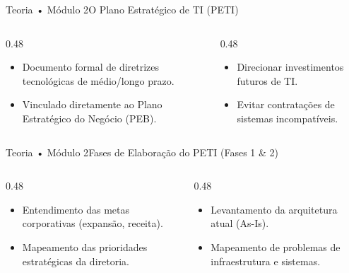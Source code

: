 \begin{senaiframe}{Teoria • Módulo 2}{O Plano Estratégico de TI (PETI)}
  \begin{columns}[t]
    \begin{column}{0.48\textwidth}
      \begin{tcolorbox}[senaibluecard, title={Conceito do PETI}]
        \begin{itemize}
          \item Documento formal de diretrizes tecnológicas de médio/longo prazo.
          \item Vinculado diretamente ao Plano Estratégico do Negócio (PEB).
        \end{itemize}
      \end{tcolorbox}
    \end{column}
    \begin{column}{0.48\textwidth}
      \begin{tcolorbox}[senaicard, title={Objetivos Centrais}]
        \begin{itemize}
          \item Direcionar investimentos futuros de TI.
          \item Evitar contratações de sistemas incompatíveis.
        \end{itemize}
      \end{tcolorbox}
    \end{column}
  \end{columns}
\end{senaiframe}

\begin{senaiframe}{Teoria • Módulo 2}{Fases de Elaboração do PETI (Fases 1 \& 2)}
  \begin{columns}[t]
    \begin{column}{0.48\textwidth}
      \begin{tcolorbox}[senaibluecard, title={Fase 1: Contexto do Negócio}]
        \begin{itemize}
          \item Entendimento das metas corporativas (expansão, receita).
          \item Mapeamento das prioridades estratégicas da diretoria.
        \end{itemize}
      \end{tcolorbox}
    \end{column}
    \begin{column}{0.48\textwidth}
      \begin{tcolorbox}[senairedcard, title={Fase 2: Diagnóstico da TI}]
        \begin{itemize}
          \item Levantamento da arquitetura atual (As-Is).
          \item Mapeamento de problemas de infraestrutura e sistemas.
        \end{itemize}
      \end{tcolorbox}
    \end{column}
  \end{columns}
\end{senaiframe}

